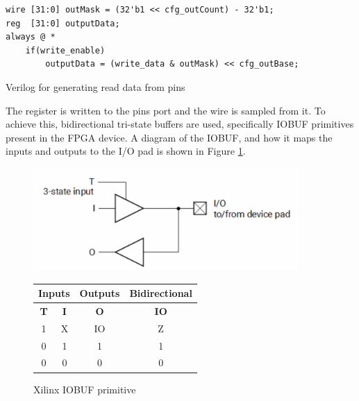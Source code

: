 \begin{listing}[h!]
    \vspace{0.5cm}
    \begin{verbatim}
wire [31:0] outMask = (32'b1 << cfg_outCount) - 32'b1;    
reg  [31:0] outputData;
always @ *
    if(write_enable)
        outputData = (write_data & outMask) << cfg_outBase;
    \end{verbatim}
    \caption{Verilog for generating read data from pins}
    \label{lst:out-mask}
\end{listing}

The  register is written to the  pins port and the  wire is sampled from it. To achieve this, bidirectional tri-state buffers are used, specifically IOBUF primitives present in the FPGA device. A diagram of the IOBUF, and how it maps the inputs and outputs to the I/O pad is shown in Figure \ref{fig:iobuf}.

\begin{figure}[H]
    \centering
    \includegraphics[width=0.9\textwidth]{../img/iobuf.png}
    \begin{tabular}{|c|c|c|c|}
        \hline
        \multicolumn{2}{|c|}{\textbf{Inputs}} & \textbf{Outputs} & \textbf{Bidirectional}               \\\hline
        \textbf{T}                            & \textbf{I}       & \textbf{O}             & \textbf{IO} \\\hline
        1                                     & X                & IO                     & Z           \\\hline
        0                                     & 1                & 1                      & 1           \\\hline
        0                                     & 0                & 0                      & 0           \\\hline
    \end{tabular}
    \caption{Xilinx IOBUF primitive \cite{vivado_libs}}
    \label{fig:iobuf}
\end{figure}

